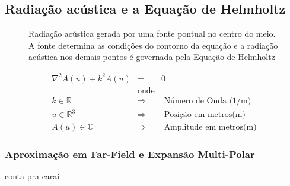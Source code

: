 \subsection{Radiação acústica e a Equação de Helmholtz}

\begin{figure}[ht]
	\centering
	
	\caption[Radiação acústica gerada uma fonte pontual]{Radiação acústica gerada por uma fonte pontual no centro do meio. A fonte determina as condições do contorno da equação e a radiação acústica nos demais pontos é governada pela Equação de Helmholtz}\label{helmholtz}
\end{figure}

\begin{eqnarray}
	\nabla^2 A(u) + k^2A(u) &=& 0\label{helmholtzequation}\\
&\text{onde}&\nonumber\\
k \in \mathbb{R} &\Rightarrow& \text{ Número de Onda (1/m)} \nonumber\\
u \in \mathbb{R}^3 &\Rightarrow& \text{ Posição em metros(m)} \nonumber\\
A(u) \in \mathbb{C} &\Rightarrow& \text{ Amplitude em metros(m)} \nonumber
\end{eqnarray}

\subsubsection{Aproximação em Far-Field e Expansão Multi-Polar}



conta pra carai